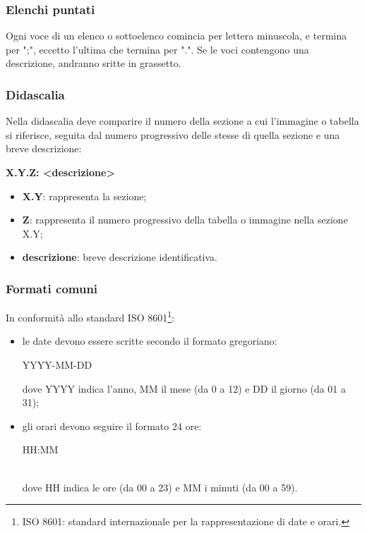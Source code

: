 \subsubsection{Elenchi puntati}
Ogni voce di un elenco o sottoelenco comincia per lettera minuscola, e termina per ";", eccetto l'ultima che termina per ".". 
Se le voci contengono una descrizione, andranno sritte in grassetto.

\subsubsection{Didascalia}
Nella didascalia deve comparire il numero della sezione a cui l'immagine o tabella si riferisce, seguita dal numero progressivo delle stesse di quella sezione e una breve descrizione: \\
\centerline{\textbf{X.Y.Z: <descrizione>}}
\begin{itemize}
\item \textbf{X.Y}: rappresenta la sezione;
\item \textbf{Z}: rappresenta il numero progressivo della tabella o immagine nella sezione X.Y;
\item \textbf{descrizione}: breve descrizione identificativa.
\end{itemize}

\subsubsection{Formati comuni}
In conformità allo standard ISO 8601\footnote{ISO 8601: standard internazionale per la rappresentazione di date e orari.}:\begin{itemize}
\item le date devono essere scritte secondo il formato gregoriano: \\
	\centerline{YYYY-MM-DD}
	dove YYYY indica l'anno, MM il mese (da 0 a 12) e DD il giorno (da 01 a 31);
\item gli orari devono seguire il formato 24 ore: \\
	\centerline{HH:MM} \\
	dove HH indica le ore (da 00 a 23) e MM i minuti (da 00 a 59).
\end{itemize} 


